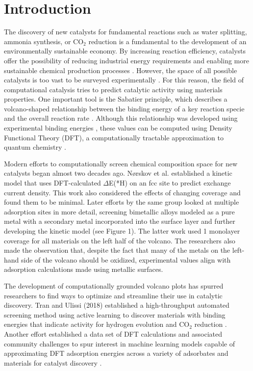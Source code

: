 \documentclass[preprint,12pt]{elsarticle}
\begin{document}

\raggedright
\section{Introduction}

The discovery of new catalysts for fundamental reactions such as water splitting, ammonia synthesis, or CO$_2$ reduction is a fundamental to the development of an environmentally sustainable economy. By increasing reaction efficiency, catalysts offer the possibility of reducing industrial energy requirements and enabling more sustainable chemical production processes \cite{osti_1545774}. However, the space of all possible catalysts is too vast to be surveyed experimentally \cite{tran2018active}. For this reason, the field of computational catalysis tries to predict catalytic activity using materials properties. One important tool is the Sabatier principle, which describes a volcano-shaped relationship between the binding energy of a key reaction specie and the overall reaction rate \cite{medford2015Sabatier}. Although this relationship was developed using experimental binding energies \cite{trasatti1972work}, these values can be computed using Density Functional Theory (DFT), a computationally tractable approximation to quantum chemistry \cite{osti_1545774,ooka2021sabatier}.

Modern efforts to computationally screen chemical composition space for new catalysts began almost two decades ago. N{\o}rskov et al. \cite{norskov2005trends} established a kinetic model that uses DFT-calculated $\Delta$E(*H) on an fcc site to predict exchange current density. This work also considered the effects of changing coverage and found them to be minimal. Later efforts by the same group looked at multiple adsorption sites in more detail, screening bimetallic alloys modeled as a pure metal with a secondary metal incorporated into the surface layer \cite{greeley2006computational} and further developing the kinetic model \cite{skulason2010modeling} (see Figure 1). The latter work used 1 monolayer coverage for all materials on the left half of the volcano. The researchers also made the observation that, despite the fact that many of the metals on the left-hand side of the volcano should be oxidized, experimental values align with adsorption calculations made using metallic surfaces. 

The development of computationally grounded volcano plots has spurred researchers to find ways to optimize and streamline their use in catalytic discovery. Tran and Ulissi (2018) established a high-throughput automated screening method using active learning to discover materials with binding energies that indicate activity for hydrogen evolution and CO$_2$ reduction \cite{tran2018active}. Another effort established a data set of DFT calculations and associated community challenges to spur interest in machine learning models capable of approximating DFT adsorption energies across a variety of adsorbates and materials for catalyst discovery \cite{chanussot2021open}. 
\end{document}
